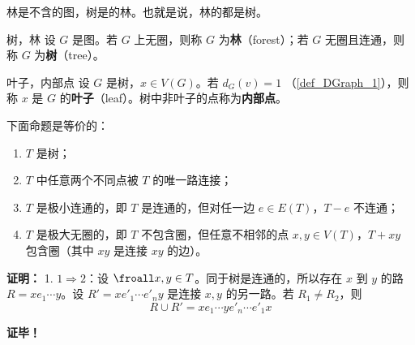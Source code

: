 
林是不含的图，树是的林。也就是说，林的都是树。

\begin{definition}{树，林}
设 $G$ 是图。若 $G$ 上无圈，则称 $G$ 为\textbf{林}（forest）；若 $G$ 无圈且连通，则称 $G$ 为\textbf{树}（tree）。
\end{definition}


\begin{definition}{叶子，内部点}
设 $G$ 是树，$x\in V(G)$。若 $d_G(v)=1$ （\autoref{def_DGraph_1}），则称 $x$ 是 $G$ 的\textbf{叶子}（leaf）。树中非叶子的点称为\textbf{内部点}。
\end{definition}

\begin{theorem}{}
下面命题是等价的：
\begin{enumerate}
\item $T$ 是树；
\item $T$ 中任意两个不同点被 $T$ 的唯一路连接；
\item $T$ 是极小连通的，即 $T$ 是连通的，但对任一边 $e\in E(T)$，$T-e$ 不连通；
\item $T$ 是极大无圈的，即 $T$ 不包含圈，但任意不相邻的点 $x,y\in V(T)$，$T+xy$ 包含圈（其中 $xy$ 是连接 $xy$ 的边）。
\end{enumerate}

\end{theorem}

\textbf{证明：}
1. $1\Rightarrow 2$：设 $\froall x,y\in T$。同于树是连通的，所以存在 $x$ 到 $y$ 的路 $R=xe_1\cdots y$。设 $R'=xe'_1\cdots e'_n y$ 是连接 $x,y$ 的另一路。若 $R_1\neq R_2$，则 
\begin{equation}
R\cup R'=xe_1\cdots ye'_n\cdots e'_1 x
\end{equation}




\textbf{证毕！}






















